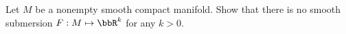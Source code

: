 Let $M$ be a nonempty smooth compact manifold.  Show that there is no smooth submersion $F:M\mapsto\bbR^k$ for any $k > 0$.